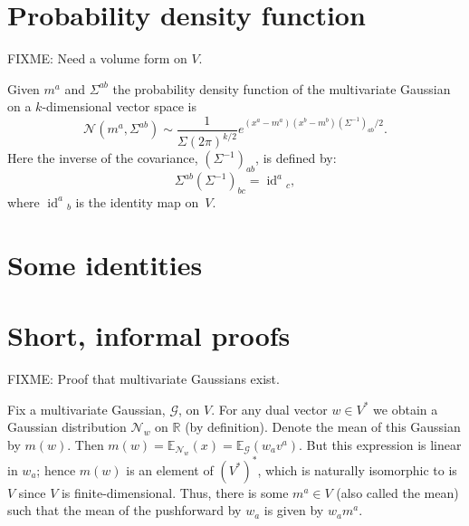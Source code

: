 \documentclass[10pt, a4paper, twocolumn]{article}
\newcommand{\R}{\mathbb{R}}
\newcommand{\E}{\mathbb{E}}
\newcommand{\N}{\mathcal{N}}
\DeclareMathOperator{\id}{id}
\begin{document}
\section{Probability density function}

FIXME: Need a volume form on $V$. 

Given $m^a$ and $\Sigma^{ab}$ the probability density function of the multivariate
Gaussian on a $k$-dimensional vector space is
\begin{equation*}
\N(m^a, \Sigma^{ab}) \sim \frac{1}{\Sigma (2\pi)^{k/2}} e^{(x^a-m^a)(x^b-m^b)(\Sigma^{-1})_{ab}/2}.
\end{equation*}
Here the inverse of the covariance, $(\Sigma^{-1})_{ab}$, is defined by:
\begin{equation*}
\Sigma^{ab} (\Sigma^{-1})_{bc} = \id^a{}_c,
\end{equation*}
where $\id^a{}_b$ is the identity map on~$V$.

\section{Some identities}




\section{Short, informal proofs}

FIXME: Proof that multivariate Gaussians exist.

Fix a multivariate Gaussian, $\mathcal{G}$, on $V$. For any dual vector $w\in V^*$
we obtain a Gaussian distribution $\N_w$ on $\R$ (by definition). Denote the
mean of this Gaussian by $m(w)$. Then $m(w) = \E_{\N_w}(x) = \E_\mathcal{G}(w_a
v^a)$. But this expression is linear in $w_a$; hence $m(w)$ is an
element of $(V^*)^*$, which is naturally isomorphic to is $V$ since $V$ is
finite-dimensional. Thus, there is some $m^a\in V$ (also called the mean) such
that the mean of the pushforward by $w_a$ is given by $w_a m^a$.
\end{document}
